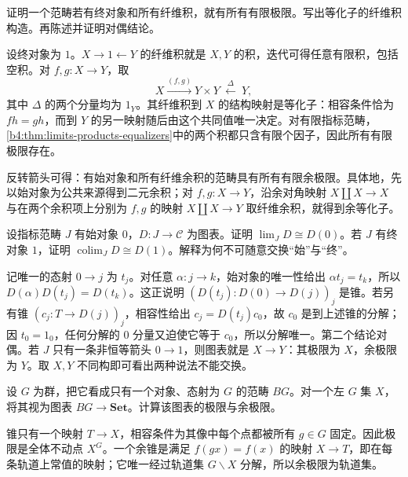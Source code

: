 \begin{exercise}\label{b4:ex:02-finite-completeness}
	证明一个范畴若有终对象和所有纤维积，就有所有有限极限。写出等化子的纤维积构造。再陈述并证明对偶结论。
\end{exercise}
\begin{solution}
	设终对象为 \(1\)。\(X\rightarrow1\leftarrow Y\) 的纤维积就是 \(X,Y\) 的积，迭代可得任意有限积，包括空积。对 \(f,g:X\rightarrow Y\)，取
	\[
		X\xrightarrow{(f,g)}Y\times Y \ \xleftarrow{\Delta}\ Y,
	\]
	其中 \(\Delta\) 的两个分量均为 \(1_Y\)。其纤维积到 \(X\) 的结构映射是等化子：相容条件恰为 \(fh=gh\)，而到 \(Y\) 的另一映射随后由这个共同值唯一决定。对有限指标范畴，\cref{b4:thm:limits-products-equalizers}中的两个积都只含有限个因子，因此所有有限极限存在。

	反转箭头可得：有始对象和所有纤维余积的范畴具有所有有限余极限。具体地，先以始对象为公共来源得到二元余积；对 \(f,g:X\rightarrow Y\)，沿余对角映射 \(X\amalg X\rightarrow X\) 与在两个余积项上分别为 \(f,g\) 的映射 \(X\amalg X\rightarrow Y\) 取纤维余积，就得到余等化子。
\end{solution}

\begin{exercise}\label{b4:ex:02-initial-index}
	设指标范畴 \(J\) 有始对象 \(0\)，\(D:J\rightarrow\mathcal C\) 为图表。证明 \(\lim_JD\cong D(0)\)。若 \(J\) 有终对象 \(1\)，证明 \(\operatorname{colim}_JD\cong D(1)\)。解释为何不可随意交换“始”与“终”。
\end{exercise}
\begin{solution}
	记唯一的态射 \(0\rightarrow j\) 为 \(t_j\)。对任意 \(\alpha:j\rightarrow k\)，始对象的唯一性给出 \(\alpha t_j=t_k\)，所以 \(D(\alpha)D(t_j)=D(t_k)\)。这正说明 \((D(t_j):D(0)\rightarrow D(j))_j\) 是锥。若另有锥 \((c_j:T\rightarrow D(j))_j\)，相容性给出 \(c_j=D(t_j)c_0\)，故 \(c_0\) 是到上述锥的分解；因 \(t_0=1_0\)，任何分解的 \(0\) 分量又迫使它等于 \(c_0\)，所以分解唯一。第二个结论对偶。若 \(J\) 只有一条非恒等箭头 \(0\rightarrow1\)，则图表就是 \(X\rightarrow Y\)：其极限为 \(X\)，余极限为 \(Y\)。取 \(X,Y\) 不同构即可看出两种说法不能交换。
\end{solution}

\begin{exercise}\label{b4:ex:02-group-action-diagram}
	设 \(G\) 为群，把它看成只有一个对象、态射为 \(G\) 的范畴 \(BG\)。对一个左 \(G\) 集 \(X\)，将其视为图表 \(BG\rightarrow\mathbf{Set}\)。计算该图表的极限与余极限。
\end{exercise}
\begin{solution}
	锥只有一个映射 \(T\rightarrow X\)，相容条件为其像中每个点都被所有 \(g\in G\) 固定。因此极限是全体不动点 \(X^G\)。一个余锥是满足 \(f(gx)=f(x)\) 的映射 \(X\rightarrow T\)，即在每条轨道上常值的映射；它唯一经过轨道集 \(G\backslash X\) 分解，所以余极限为轨道集。
\end{solution}

